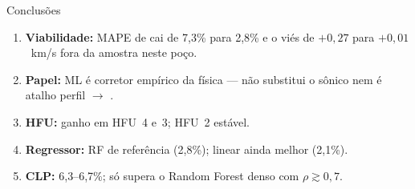 \documentclass[aspectratio=169,10pt]{beamer}
\begin{document}
\begin{frame}{Conclusões}
  \footnotesize
  \begin{enumerate}
    \item \textbf{Viabilidade:} MAPE de \Vp{} cai de 7,3\% para 2,8\% e o viés
          de $+0{,}27$ para $+0{,}01$~km/s fora da amostra neste poço.
    \item \textbf{Papel:} ML é corretor empírico da física --- não substitui o
          sônico nem é atalho perfil $\rightarrow$ \Vp{}.
    \item \textbf{HFU:} ganho em HFU~4 e~3; HFU~2 estável.
    \item \textbf{Regressor:} RF de referência (2,8\%); linear ainda melhor (2,1\%).
    \item \textbf{CLP:} 6,3--6,7\%; só supera o Random Forest denso com
          $\rho \gtrsim 0{,}7$.
  \end{enumerate}
\end{frame}
\end{document}
